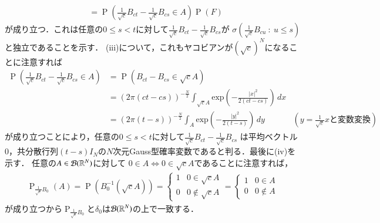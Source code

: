 \begin{prf}
\begin{description}
\begin{align}
			&= \operatorname{P}\left(\tfrac{1}{\sqrt{c}}B_{ct} - \tfrac{1}{\sqrt{c}}B_{cs} \in A \right)  \operatorname{P}(F)
		\end{align}
		が成り立つ．これは任意の$0 \leq s < t$に対して$\tfrac{1}{\sqrt{c}}B_{ct} - \tfrac{1}{\sqrt{c}}B_{cs}$が
		$\sigma\left(\tfrac{1}{\sqrt{c}}B_{cu}\ :\ u \leq s\right)$と独立であることを示す．
		(iii)について，これもヤコビアンが$\left(\sqrt{c}\right)^{N}$になることに注意すれば
		\begin{align}
			\operatorname{P}\left( \tfrac{1}{\sqrt{c}}B_{ct} - \tfrac{1}{\sqrt{c}}B_{cs} \in A \right)
			&= \operatorname{P}\left( B_{ct} - B_{cs} \in \sqrt{c}A \right) \\
			&= (2\pi(ct-cs))^{-\frac{N}{2}} \int_{\sqrt{c}A} \mathrm{exp}\left( -\frac{|x|^2}{2(ct-cs)} \right)\, dx \\
			&= (2\pi(t-s))^{-\frac{N}{2}} \int_{A} \mathrm{exp}\left( -\frac{|y|^2}{2(t-s)} \right)\, dy 
				& \left( y = \tfrac{1}{\sqrt{c}}x\mbox{と変数変換}\right)
		\end{align}
		が成り立つことにより，任意の$0 \leq s < t$に対して$\tfrac{1}{\sqrt{c}}B_{ct} - \tfrac{1}{\sqrt{c}}B_{cs}$
		は平均ベクトル0，共分散行列$(t-s)I_N$の$N$次元Gauss型確率変数であると判る．最後に(iv)を示す．
		任意の$A \in \mathcal{B}(\mathbb{R}^N)$に対して
		$0 \in A \Leftrightarrow 0 \in \sqrt{c}A$であることに注意すれば，
		\begin{align}
			\operatorname{P}_{\tfrac{1}{\sqrt{c}}B_0}(A) 
			= \operatorname{P}\left(B_0^{-1}\left(\sqrt{c}A\right)\right)
			= \begin{cases}
				1 & 0 \in \sqrt{c}A \\
				0 & 0 \notin \sqrt{c}A
			\end{cases}
			= \begin{cases}
				1 & 0 \in A \\
				0 & 0 \notin A
			\end{cases}
		\end{align}
		が成り立つから$\operatorname{P}_{\tfrac{1}{\sqrt{c}}B_0}$と$\delta_0$は$\mathcal{B}(\mathbb{R}^N)$の上で一致する．
		

\end{description}
\end{prf}
